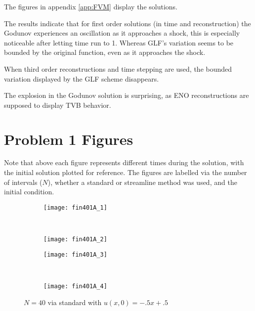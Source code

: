 \documentclass[10pt,letterpaper,fleqn]{article}
\begin{document}
The figures in appendix \ref{app:FVM} display the solutions.

The results indicate that for first order solutions (in time and reconstruction)
the Godunov experiences an oscillation as it approaches a shock,
this is especially noticeable after letting time run to 1.
Whereas GLF's variation seems to be bounded by the original function,
even as it approaches the shock.

When third order reconstructions and time stepping are used,
the bounded variation displayed by the GLF scheme disappears.

The explosion in the Godunov solution is surprising, as ENO reconstructions
are supposed to display TVB behavior.

\appendix
\section{Problem 1 Figures}\label{app:FEM}
Note that above each figure represents different times during the solution, with the initial solution plotted for reference.
The figures are labelled via the number of intervals ($N$),
whether a standard or streamline method was used, and the initial condition.

\begin{figure}[h!]
        \centering
        \begin{subfigure}[b]{0.4\textwidth}
                \texttt{[image: fin401A\_1]}
        \end{subfigure}%
        ~ 
        \begin{subfigure}[b]{0.4\textwidth}
                \texttt{[image: fin401A\_2]}
        \end{subfigure}
        
        \begin{subfigure}[b]{0.4\textwidth}
                \texttt{[image: fin401A\_3]}
        \end{subfigure}
        ~
        \begin{subfigure}[b]{0.4\textwidth}
                \texttt{[image: fin401A\_4]}
        \end{subfigure}
        \caption{$N = 40$ via standard with $u(x,0) = -.5x + .5$}
\end{figure}
\end{document}
